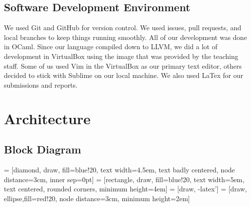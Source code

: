 \documentclass{article}
\begin{document}
\subsection{Software Development Environment}
We used Git and GitHub for version control.  We used issues, pull requests, and local branches to keep things running smoothly.  All of our development was done in OCaml.  Since our language compiled down to LLVM, we did a lot of development in VirtualBox using the image that was provided by the teaching staff.  Some of us used Vim in the VirtualBox as our primary text editor, others decided to stick with Sublime on our local machine.  We also used LaTex for our submissions and reports.

\newpage

\section{Architecture}

\subsection{Block Diagram}
 = [diamond, draw, fill=blue!20, 
    text width=4.5em, text badly centered, node distance=3cm, inner sep=0pt]
 = [rectangle, draw, fill=blue!20, 
    text width=5em, text centered, rounded corners, minimum height=4em]
 = [draw, -latex']
 = [draw, ellipse,fill=red!20, node distance=3cm,
    minimum height=2em]
    
\end{document}
